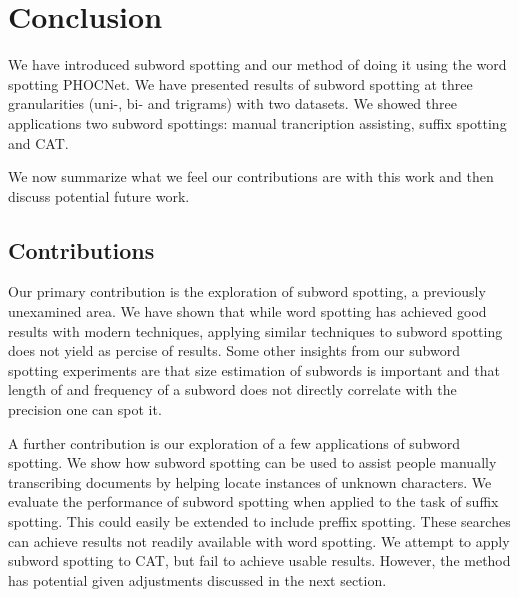 \documentclass[ms,electronic,twosidetoc,letterpaper,chaptercenter,parttop,lol,lof,lot]{byumsphd}
\begin{document}




\chapter{Conclusion}

We have introduced subword spotting and our method of doing it using the word spotting PHOCNet. We have presented results of subword spotting at three granularities (uni-, bi- and trigrams) with two datasets. We showed three applications two subword spottings: manual trancription assisting, suffix spotting and CAT.

We now summarize what we feel our contributions are with this work and then discuss potential future work.

\section{Contributions}


Our primary contribution is the exploration of subword spotting, a previously unexamined area. We have shown that while word spotting has achieved good results with modern techniques, applying similar techniques to subword spotting does not yield as percise of results.
Some other insights from our subword spotting experiments are that 
size estimation of subwords is important 
and that
length of and frequency of  a subword does not directly correlate with the precision one can spot it.

A further contribution is our exploration of a few applications of subword spotting.
We show how subword spotting can be used to assist people manually transcribing documents by helping locate instances of unknown characters.
We evaluate the performance of subword spotting when applied to the task of suffix spotting. This could easily be extended to include preffix spotting. These searches can achieve results not readily available with word spotting.
We attempt to apply subword spotting to CAT, but fail to achieve usable results. However, the method has potential given adjustments discussed in the next section.
\end{document}
